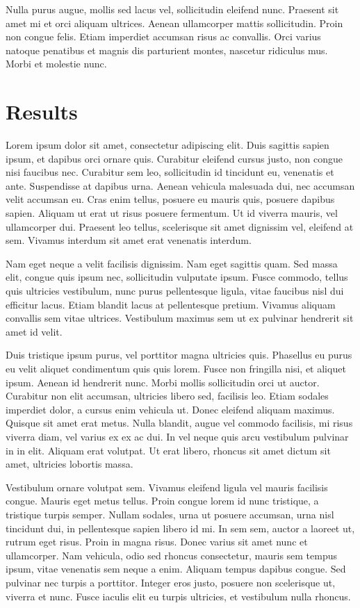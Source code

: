 \documentclass[9pt,biorxiv,doublespacing,lineno]{lapreprint}
\begin{document}
Nulla purus augue, mollis sed lacus vel, sollicitudin eleifend nunc.
Praesent sit amet mi et orci aliquam ultrices. Aenean ullamcorper mattis
sollicitudin. Proin non congue felis. Etiam imperdiet accumsan risus ac
convallis. Orci varius natoque penatibus et magnis dis parturient
montes, nascetur ridiculus mus. Morbi et molestie nunc.

\hypertarget{results}{%
\section{Results}\label{results}}

Lorem ipsum dolor sit amet, consectetur adipiscing elit. Duis sagittis
sapien ipsum, et dapibus orci ornare quis. Curabitur eleifend cursus
justo, non congue nisi faucibus nec. Curabitur sem leo, sollicitudin id
tincidunt eu, venenatis et ante. Suspendisse at dapibus urna. Aenean
vehicula malesuada dui, nec accumsan velit accumsan eu. Cras enim
tellus, posuere eu mauris quis, posuere dapibus sapien. Aliquam ut erat
ut risus posuere fermentum. Ut id viverra mauris, vel ullamcorper dui.
Praesent leo tellus, scelerisque sit amet dignissim vel, eleifend at
sem. Vivamus interdum sit amet erat venenatis interdum.

Nam eget neque a velit facilisis dignissim. Nam eget sagittis quam. Sed
massa elit, congue quis ipsum nec, sollicitudin vulputate ipsum. Fusce
commodo, tellus quis ultricies vestibulum, nunc purus pellentesque
ligula, vitae faucibus nisl dui efficitur lacus. Etiam blandit lacus at
pellentesque pretium. Vivamus aliquam convallis sem vitae ultrices.
Vestibulum maximus sem ut ex pulvinar hendrerit sit amet id velit.

Duis tristique ipsum purus, vel porttitor magna ultricies quis.
Phasellus eu purus eu velit aliquet condimentum quis quis lorem. Fusce
non fringilla nisi, et aliquet ipsum. Aenean id hendrerit nunc. Morbi
mollis sollicitudin orci ut auctor. Curabitur non elit accumsan,
ultricies libero sed, facilisis leo. Etiam sodales imperdiet dolor, a
cursus enim vehicula ut. Donec eleifend aliquam maximus. Quisque sit
amet erat metus. Nulla blandit, augue vel commodo facilisis, mi risus
viverra diam, vel varius ex ex ac dui. In vel neque quis arcu vestibulum
pulvinar in in elit. Aliquam erat volutpat. Ut erat libero, rhoncus sit
amet dictum sit amet, ultricies lobortis massa.

Vestibulum ornare volutpat sem. Vivamus eleifend ligula vel mauris
facilisis congue. Mauris eget metus tellus. Proin congue lorem id nunc
tristique, a tristique turpis semper. Nullam sodales, urna ut posuere
accumsan, urna nisl tincidunt dui, in pellentesque sapien libero id mi.
In sem sem, auctor a laoreet ut, rutrum eget risus. Proin in magna
risus. Donec varius sit amet nunc et ullamcorper. Nam vehicula, odio sed
rhoncus consectetur, mauris sem tempus ipsum, vitae venenatis sem neque
a enim. Aliquam tempus dapibus congue. Sed pulvinar nec turpis a
porttitor. Integer eros justo, posuere non scelerisque ut, viverra et
nunc. Fusce iaculis elit eu turpis ultricies, et vestibulum nulla
rhoncus.
\end{document}
